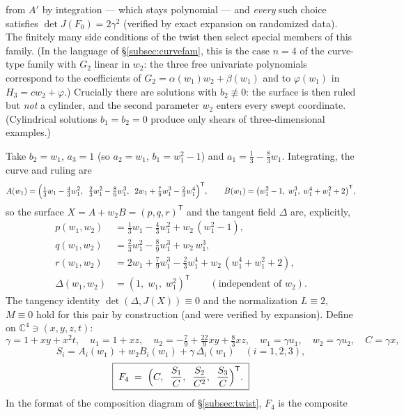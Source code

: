 \documentclass[11pt]{article}
\theoremstyle{plain}
\theoremstyle{definition}
\theoremstyle{remark}
\newcommand{\C}{\mathbb{C}}
\begin{document}
from $A'$ by integration --- which stays polynomial --- and \emph{every}
such choice satisfies $\det J(F_0)=2\gamma^2$ (verified by exact expansion on
randomized data). The finitely many side conditions of the twist then select
special members of this family. (In the language of \S\ref{subsec:curvefam},
this is the case $n=4$ of the curve-type family with $G_2$ linear in $w_2$:
the three free univariate polynomials correspond to the coefficients of
$G_2=\alpha(w_1)w_2+\beta(w_1)$ and to $\varphi(w_1)$ in
$H_3=cw_2+\varphi$.)
Crucially there are solutions with $b_2\not\equiv0$: the surface is then ruled but
\emph{not} a cylinder, and the second parameter $w_2$ enters every swept
coordinate. (Cylindrical solutions $b_1=b_2=0$ produce only shears of
three-dimensional examples.)

Take $b_2=w_1$, $a_3=1$ (so $a_2=w_1$, $b_1=w_1^2-1$) and
$a_1=\tfrac13-\tfrac83w_1$. Integrating, the curve and ruling are
\[
A(w_1)=\Bigl(\tfrac13w_1-\tfrac43w_1^2,\;\;
\tfrac23w_1^2-\tfrac89w_1^3,\;\;
2w_1+\tfrac79w_1^3-\tfrac23w_1^4\Bigr)^{\mathsf T},\qquad
B(w_1)=\bigl(w_1^2-1,\;w_1^3,\;w_1^4+w_1^2+2\bigr)^{\mathsf T},
\]
so the surface $X=A+w_2B=(p,q,r)^{\mathsf T}$ and the tangent field $\Delta$ are, explicitly,
\begin{align*}
p(w_1,w_2)&=\tfrac13w_1-\tfrac43w_1^2+w_2\,(w_1^2-1),\\
q(w_1,w_2)&=\tfrac23w_1^2-\tfrac89w_1^3+w_2\,w_1^3,\\
r(w_1,w_2)&=2w_1+\tfrac79w_1^3-\tfrac23w_1^4+w_2\,(w_1^4+w_1^2+2),\\
\Delta(w_1,w_2)&=(1,\;w_1,\;w_1^2)^{\mathsf T}
\qquad(\text{independent of }w_2).
\end{align*}
The tangency identity $\det(\Delta,J(X))\equiv0$ and the
normalization $L\equiv2$, $M\equiv0$ hold for this pair by construction (and were
verified by expansion).
Define on $\C^4\ni(x,y,z,t)$:
\[
\gamma=1+xy+x^2t,\quad u_1=1+xz,\quad
u_2=-\tfrac79+\tfrac{22}9xy+\tfrac83xz,\quad
w_1=\gamma u_1,\quad w_2=\gamma u_2,\quad C=\gamma x,
\]
\[
S_i=A_i(w_1)+w_2B_i(w_1)+\gamma\,\Delta_i(w_1)\quad(i=1,2,3),
\]
\[
\boxed{\;F_4\;=\;\Bigl(C,\;\;\frac{S_1}{C},\;\;\frac{S_2}{C^2},\;\;\frac{S_3}{C}\Bigr)^{\mathsf T}.\;}
\]
In the format of the composition diagram of \S\ref{subsec:twist}, $F_4$ is the
composite
\end{document}
